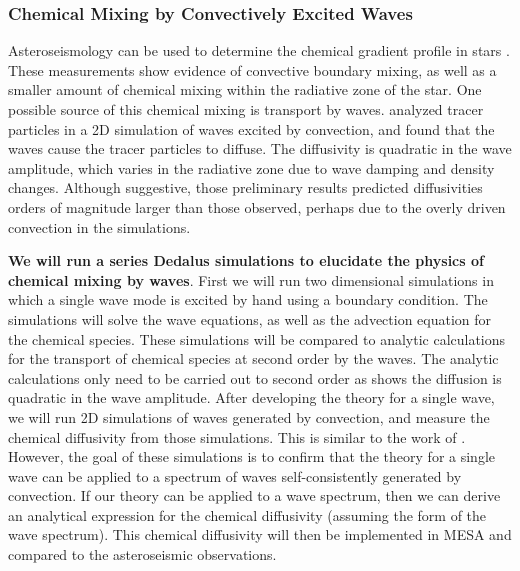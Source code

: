 {\color{purple}
\subsubsection{Chemical Mixing by Convectively Excited Waves}
}

Asteroseismology can be used to determine the chemical gradient profile in stars \citep{moravveji:15,moravveji:16,Ghasemi_2016}. These measurements show evidence of convective boundary mixing, as well as a smaller amount of chemical mixing within the radiative zone of the star. One possible source of this chemical mixing is transport by waves. \citet{Rogers2017} analyzed tracer particles in a 2D simulation of waves excited by convection, and found that the waves cause the tracer particles to diffuse. The diffusivity is quadratic in the wave amplitude, which varies in the radiative zone due to wave damping and density changes. Although suggestive, those preliminary results predicted diffusivities orders of magnitude larger than those observed, perhaps due to the overly driven convection in the simulations. 

\textbf{We will run a series  Dedalus simulations to elucidate the physics of chemical mixing by waves}. First we will run two dimensional simulations in which a single wave mode is excited by hand using a boundary condition. The simulations will solve the wave equations, as well as the advection equation for the chemical species. These simulations will be compared to analytic calculations for the transport of chemical species at second order by the waves. The analytic calculations only need to be carried out to second order as \citet{Rogers2017} shows the diffusion is quadratic in the wave amplitude. After developing the theory for a single wave, we will run 2D simulations of waves generated by convection, and measure the chemical diffusivity from those simulations. This is similar to the work of \citet{Rogers2017}. However, the goal of these simulations is to confirm that the theory for a single wave can be applied to a spectrum of waves self-consistently generated by convection. If our theory can be applied to a wave spectrum, then we can derive an analytical expression for the chemical diffusivity (assuming the form of the wave spectrum). This chemical diffusivity will then be implemented in MESA and compared to the asteroseismic observations.
